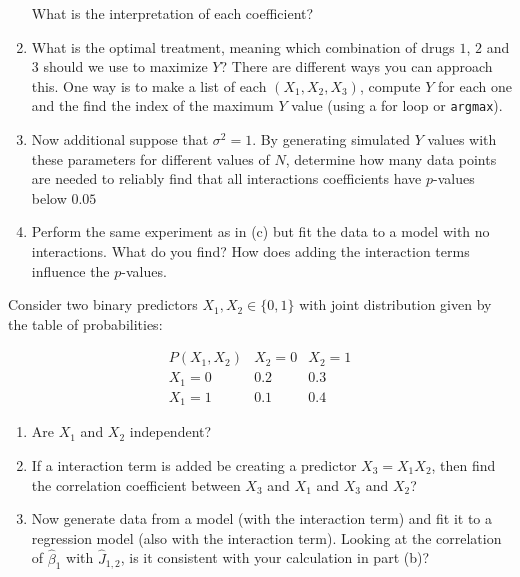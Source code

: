 \begin{exercise}
\begin{enumerate}[label=(\alph*)]
What is the interpretation of each coefficient? 
\item 
What is the optimal treatment, meaning which combination of drugs $1$, $2$ and $3$ should we use to maximize $Y$? There are different ways you can approach this. One way is to make a list of each $(X_1,X_2,X_3)$, compute $Y$ for each one and the find the index of the maximum $Y$ value (using a for loop or \verb!argmax!). 
\item Now additional suppose that $\sigma^2 = 1$. 
By generating simulated $Y$ values with these parameters for different values of $N$, determine how many data points are needed to reliably find that all interactions coefficients have $p$-values below $0.05$
\item Perform the same experiment as in (c) but fit the data to a model with no interactions. What do you find? How does adding the interaction terms influence the $p$-values. 
\end{enumerate}
\end{exercise}


\begin{exercise}
Consider two binary predictors \(X_1, X_2 \in \{0,1\}\) with joint distribution given by the table of probabilities:

\[
\begin{array}{c|cc}
P(X_1, X_2) & X_2=0 & X_2=1 \\ \hline
X_1=0 & 0.2 & 0.3 \\
X_1=1 & 0.1 & 0.4
\end{array}
\]

\begin{enumerate}[label=(\alph*)]
\item Are $X_1$ and $X_2$ independent? 
\item If a interaction term is added be creating a predictor $X_3 = X_1X_2$, then find the correlation coefficient between $X_3$ and $X_1$ and $X_3$ and $X_2$? 
\item Now generate data from a model (with the interaction term) and fit it to a regression model (also with the interaction term). Looking at the correlation of $\hat{\beta}_1$ with $\hat{J}_{1,2}$, is it consistent with your calculation in part (b)? 
\end{enumerate}
\end{exercise}








 






